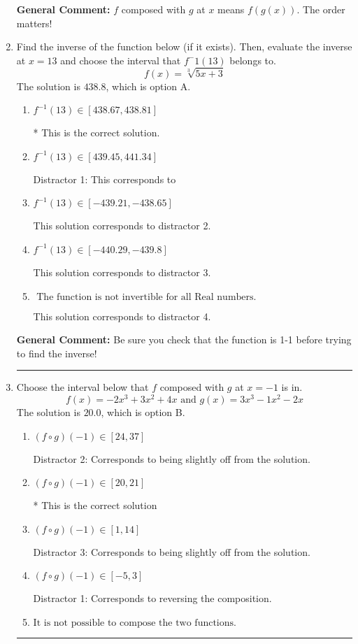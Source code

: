 \documentclass{extbook}[14pt]
\newcommand{\litem}[1]{\item #1

\rule{\textwidth}{0.4pt}}
\begin{document}
\begin{enumerate}
{\textbf{General Comment:} $f$ composed with $g$ at $x$ means $f(g(x))$. The order matters!
}
\litem{
Find the inverse of the function below (if it exists). Then, evaluate the inverse at $x = 13$ and choose the interval that $f^-1(13)$ belongs to.
\[ f(x) = \sqrt[3]{5 x + 3} \]The solution is \( 438.8 \), which is option A.\begin{enumerate}[label=\Alph*.]
\item \( f^{-1}(13) \in [438.67, 438.81] \)

* This is the correct solution.
\item \( f^{-1}(13) \in [439.45, 441.34] \)

 Distractor 1: This corresponds to 
\item \( f^{-1}(13) \in [-439.21, -438.65] \)

 This solution corresponds to distractor 2.
\item \( f^{-1}(13) \in [-440.29, -439.8] \)

 This solution corresponds to distractor 3.
\item \( \text{ The function is not invertible for all Real numbers. } \)

 This solution corresponds to distractor 4.
\end{enumerate}

\textbf{General Comment:} Be sure you check that the function is 1-1 before trying to find the inverse!
}
\litem{
Choose the interval below that $f$ composed with $g$ at $x=-1$ is in.
\[ f(x) = -2x^{3} +3 x^{2} +4 x \text{ and } g(x) = 3x^{3} -1 x^{2} -2 x \]The solution is \( 20.0 \), which is option B.\begin{enumerate}[label=\Alph*.]
\item \( (f \circ g)(-1) \in [24, 37] \)

 Distractor 2: Corresponds to being slightly off from the solution.
\item \( (f \circ g)(-1) \in [20, 21] \)

* This is the correct solution
\item \( (f \circ g)(-1) \in [1, 14] \)

 Distractor 3: Corresponds to being slightly off from the solution.
\item \( (f \circ g)(-1) \in [-5, 3] \)

 Distractor 1: Corresponds to reversing the composition.
\item \( \text{It is not possible to compose the two functions.} \)


\end{enumerate}

}
\end{enumerate}
\end{document}
